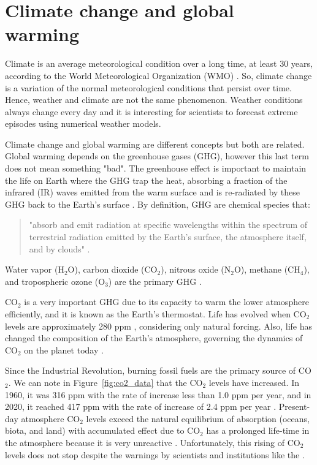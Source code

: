 \section{Climate change and global warming}\label{sec:climate change}
Climate is an average meteorological condition over a long time, at least 30 years, according to the World Meteorological Organization (WMO) \citep{IPCC2013}. 
So, climate change is a variation of the normal meteorological conditions that persist over time.
Hence, weather and climate are not the same phenomenon.
Weather conditions always change every day and it is interesting for scientists to forecast extreme episodes using numerical weather models.

Climate change and global warming are different concepts but both are related.
Global warming depends on the greenhouse gases (GHG), however this last term does not mean something "bad".
The greenhouse effect is important to maintain the life on Earth where the GHG trap the heat, absorbing a fraction of the infrared (IR) waves emitted from the warm surface and is re-radiated by these GHG back to the Earth's surface \citep{Farmer2013}.
By definition, GHG are chemical species that: 
\begin{quote}
    "absorb and emit radiation at specific wavelengths within the spectrum of terrestrial radiation emitted by the Earth's surface, the atmosphere itself, and by clouds" \citep{IPCC2013}. 
\end{quote}
Water vapor (H$_2$O), carbon dioxide (CO$_2$), nitrous oxide (N$_2$O), methane (CH$_4$), and tropospheric ozone (O$_3$) are the primary GHG \citep{IPCC2013, Von2015}.

CO$_2$ is a very important GHG due to its capacity to warm the lower atmosphere efficiently, and it is known as the Earth's thermostat.
Life has evolved when CO$_2$ levels are approximately 280 ppm \citep{Farmer2013}, considering only natural forcing. 
Also, life has changed the composition of the Earth's atmosphere, governing the dynamics of CO$_2$ on the planet today \citep{Kasting1993}.

Since the Industrial Revolution, burning fossil fuels are the primary source of CO$_2$.
We can note in Figure~\ref{fig:co2_data} that the CO$_2$ levels have increased.
In 1960, it was 316 ppm with the rate of increase less than 1.0 ppm per year, and in 2020, it reached 417 ppm with the rate of increase of 2.4 ppm per year \citep{Tans2021, Letcher2021}.
Present-day atmosphere CO$_2$ levels exceed the natural equilibrium of absorption (oceans, biota, and land) with accumulated effect due to CO$_2$ has a prolonged life-time in the atmosphere because it is very unreactive \citep{Letcher2021}.
Unfortunately, this rising of CO$_2$ levels does not stop despite the warnings by scientists and institutions like the \citet{IPCC2013}.

